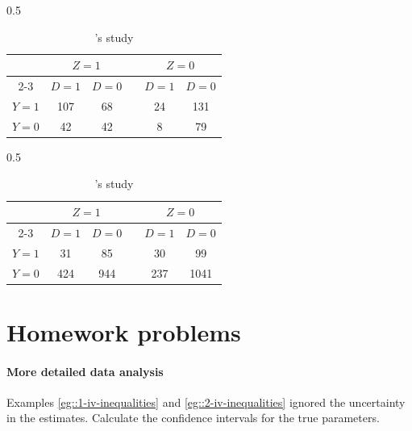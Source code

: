  \begin{table}[t]
\caption{Binary data and IV inequalities}
\begin{center}
\begin{subtable}{0.5\textwidth}
\caption{ \citet{improve2014endovascular}'s study}
\begin{tabular}{cccccc} 
\hline 
      &   \multicolumn{2}{c}{$Z=1$}  &  &  \multicolumn{2}{c}{$Z=0$}  \\  \cline{2-3} \cline{5-6} 
      & $D=1$  &  $D=0$           &       &  $D=1$  &  $D=0$\\
 $Y=1$ &   107    &      68         &      &    24       &    131        \\
 $Y=0$ &   42    &     42            &      &     8         &     79           \\  
 \hline
\end{tabular}
\label{tab::data1}
\end{subtable}%
\vspace{0.1in}
\begin{subtable}{0.5\textwidth}
\caption{ \citet{hirano2000assessing}'s study}
\begin{tabular}{cccccc}
\hline 
      &   \multicolumn{2}{c}{$Z=1$}  &  &  \multicolumn{2}{c}{$Z=0$}  \\  \cline{2-3} \cline{5-6} 
      & $D=1$  &  $D=0$           &       &  $D=1$  &  $D=0$\\
 $Y=1$ &   31    &     85         &      &     30       &    99       \\
 $Y=0$ &   424   &     944            &      &     237         &    1041           \\  
 \hline
\end{tabular}
\label{tab::data2}
\end{subtable}
\end{center}
\end{table}%

 
 
\section{Homework problems}

\paragraph{More detailed data analysis}\label{hw::more-data-binary}

Examples \ref{eg::1-iv-inequalities} and \ref{eg::2-iv-inequalities} ignored the uncertainty in the estimates. Calculate the confidence intervals for the true parameters. 
 



